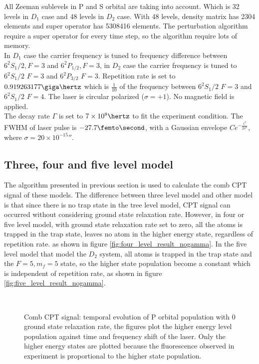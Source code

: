 \documentclass[11pt,a4paper]{article}
\begin{document}
All Zeeman sublevels in P and S orbital are taking into account. Which is 32 levels in $D_1$ case and 48 levels in $D_2$ case. With 48 levels, density matrix has 2304 elements and super operator has 5308416 elements. The perturbation algorithm require a super operator for every time step, so the algorithm require lots of memory.\\

In $D_1$ case the carrier frequency is tuned to frequency difference between $6^2S_1/2, F=3$ and $6^2P_{1/2}, F=3$, in $D_2$ case the carrier frequency is tuned to $6^2S_1/2$ $F=3$ and $6^2P_{3/2}$ $F=3$. Repetition rate is set to $0.919263177 \giga\hertz$ which is $\frac{1}{10}$ of the frequency between $6^2S_1/2$ $F=3$ and $6^2S_1/2$ $F=4$. The laser is circular polarized ($\sigma = +1$). No magnetic field is applied.\\

The decay rate $\Gamma$ is set to $7 \times 10^8 \hertz$ to fit the experiment condition. The FWHM of laser pulse is $-27.7\femto\second$, with a Gaussian envelope $C e^{ - \frac{t^2}{2 \sigma^{2}} }$, where $\sigma = 20 \times 10^{-15} \second$.\\

\subsection{Three, four and five level model}
The algorithm presented in previous section is used to calculate the comb CPT signal of these models. The difference between three level model and other model is that since there is no trap state in the tree level model, CPT signal can occurred without considering ground state relaxation rate. However, in four or five level model, with ground state relaxation rate set to zero, all the atoms is trapped in the trap state, leaves no atom in the higher energy state, regardless of repetition rate. as shown in figure \ref{fig:four_level_result_nogamma}. In the five level model that model the $D_2$ system, all atoms is trapped in the trap state and the $F=5, m_f=5$ state, so the higher state population become a constant which is independent of repetition rate, as shown in figure \ref{fig:five_level_result_nogamma}.\\
\begin{figure}[H]
  \centering
  \\
  \caption{Comb CPT signal: temporal evolution of P orbital population with 0 ground state relaxation rate, the figures plot the higher energy level population against time and frequency shift of the laser. Only the higher energy states are plotted because the fluorescence observed in experiment is proportional to the higher state population.}
  \label{fig:nogamma}
\end{figure}
\end{document}
